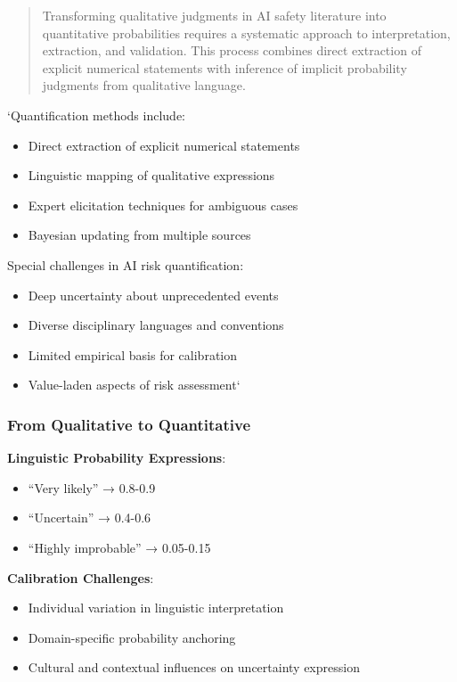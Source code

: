 \documentclass[
  11pt,
  letterpaper,
]{book}
\providecommand{\tightlist}{%
  \setlength{\itemsep}{0pt}\setlength{\parskip}{0pt}}
\begin{document}
\begin{quote}
Transforming qualitative judgments in AI safety literature into
quantitative probabilities requires a systematic approach to
interpretation, extraction, and validation. This process combines direct
extraction of explicit numerical statements with inference of implicit
probability judgments from qualitative language.
\end{quote}

`Quantification methods include:

\begin{itemize}
\tightlist
\item
  Direct extraction of explicit numerical statements
\item
  Linguistic mapping of qualitative expressions
\item
  Expert elicitation techniques for ambiguous cases
\item
  Bayesian updating from multiple sources
\end{itemize}

Special challenges in AI risk quantification:

\begin{itemize}
\tightlist
\item
  Deep uncertainty about unprecedented events
\item
  Diverse disciplinary languages and conventions
\item
  Limited empirical basis for calibration
\item
  Value-laden aspects of risk assessment`
\end{itemize}

\subsubsection{From Qualitative to
Quantitative}\label{sec-qualitative-to-quantitative}

\textbf{Linguistic Probability Expressions}:

\begin{itemize}
\tightlist
\item
  ``Very likely'' → 0.8-0.9
\item
  ``Uncertain'' → 0.4-0.6
\item
  ``Highly improbable'' → 0.05-0.15
\end{itemize}

\textbf{Calibration Challenges}:

\begin{itemize}
\tightlist
\item
  Individual variation in linguistic interpretation
\item
  Domain-specific probability anchoring
\item
  Cultural and contextual influences on uncertainty expression
\end{itemize}
\end{document}
